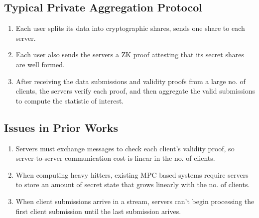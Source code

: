 \subsection{Typical Private Aggregation Protocol}
\begin{enumerate}
    \item Each user splits its data into cryptographic shares, sends one share to each server.
    \item Each user also sends the servers a ZK proof attesting that its secret shares are well formed.
    \item After receiving the data submissions and validity proofs from a large no. of clients, the servers verify each proof, and then aggregate the valid submissions to compute the statistic of interest.
\end{enumerate}

\subsection{Issues in Prior Works}
\begin{enumerate}
    \item Servers must exchange messages to check each client's validity proof, so server-to-server communication cost is linear in the no. of clients.
    \item When computing heavy hitters, existing MPC based systems require servers to store an amount of secret state that grows linearly with the no. of clients.
    \item When client submissions arrive in a stream, servers can't begin processing the first client submission until the last submission arives.
\end{enumerate}

